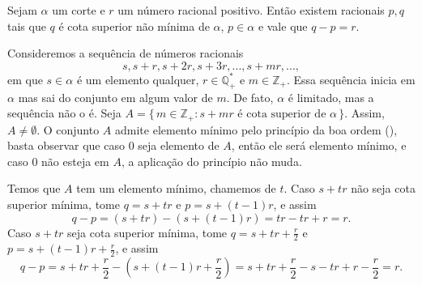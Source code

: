 \documentclass[../main.tex]{subfiles}
\begin{document}
\begin{lema}\label{reais-lema-pqNaoMinimo}
    Sejam $\alpha$ um corte e $r$ um número racional positivo. Então existem racionais $p,q$ tais que $q$ é cota superior não mínima de $\alpha$, $p \in \alpha$ e vale que $q-p = r$.
\end{lema}
\begin{dem}
    Consideremos a sequência de números racionais 
    \[ s, s+r, s+2r, s+3r, ..., s+mr, ...,\] 
    em que $s \in \alpha$ é um elemento qualquer, $r \in \mathbb{Q}_{+}^*$ e $m \in \mathbb{Z}_{+}$. Essa sequência inicia em $\alpha$ mas sai do conjunto em algum valor de $m$. De fato, $\alpha$ é limitado, mas a sequência não o é. Seja $A = \{\,m \in \mathbb{Z}_{+} : s+mr \text{ é cota superior de } \alpha \,\}$. Assim, $A \neq \emptyset$. O conjunto $A$ admite elemento mínimo pelo princípio da boa ordem (), basta observar que caso $0$ seja elemento de $A$, então ele será elemento mínimo, e caso $0$ não esteja em $A$, a aplicação do princípio não muda.

    Temos que $A$ tem um elemento mínimo, chamemos de $t$. Caso $s+tr$ não seja cota superior mínima, tome $q = s+tr$ e $p = s+(t-1)r$, e assim 
    \[ q-p =  (s+tr) - (s+(t-1)r) = tr -tr + r = r. \]
    Caso $s+tr$ seja cota superior mínima, tome $q = s+tr+\frac{r}{2}$ e $p = s+(t-1)r+\frac{r}{2}$, e assim 
    \[ q - p = s+tr+\frac{r}{2} - \left(s+(t-1)r+\frac{r}{2}\right) = s + tr + \frac{r}{2} - s - tr + r - \frac{r}{2} = r. \]
    
\end{dem}
\end{document}

